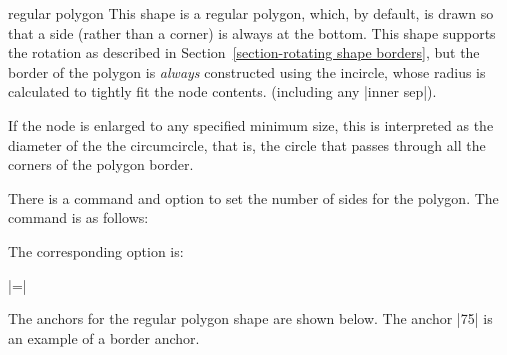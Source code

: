 \begin{shape}{regular polygon}
  This shape is a regular polygon, which, by default, is drawn so that 
  a side (rather than a corner) is always at the bottom. 
  This shape supports the rotation as described in 
  Section~\ref{section-rotating shape borders}, but the border of the 
  polygon is \emph{always} constructed using the incircle, whose
  radius is calculated to tightly fit the node contents. (including
  any |inner sep|).
  
\begin{codeexample}[]
\end{codeexample}	
	
  If the node is enlarged to any specified minimum size, 
  this is interpreted as the diameter of the the 
  circumcircle, that is, the circle that passes through all the 
  corners of the polygon border.

\begin{codeexample}[]
\end{codeexample}	

  There is a \pgfname{} command and \tikzname{} option to set the 
  number of sides for the polygon. The \pgfname{} command is as 
  follows:
	
  \begin{command}{\pgfsetpolygonsides{}}
  \end{command}
  
  The corresponding \tikzname{} option is:

  \begin{itemize}
    |=|
  \end{itemize}
  
  The anchors for the regular polygon shape are shown below.  
  The anchor |75| is an example of a border anchor.
  

\end{shape}
